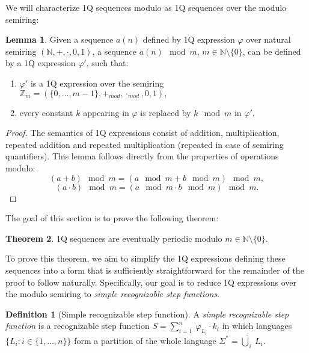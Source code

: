 \documentclass[12pt]{article}
\theoremstyle{definition}
\newtheorem{definition}{Definition}[section]
\newtheorem{theorem}{Theorem}[section]
\newtheorem{lemma}[theorem]{Lemma}
\begin{document}
We will characterize 1Q sequences modulo as 1Q sequences over the modulo semiring:

\begin{lemma}
    \label{1QModulo}
    Given a sequence $a(n)$ defined by 1Q expression $\varphi$ over natural semiring $(\mathbb{N}, +, \cdot, 0, 1)$, a sequence $a(n) \mod m$, $m \in \mathbb{N} \setminus \{0\}$, can be defined by a 1Q expression $\varphi'$, such that:
    \begin{enumerate}
        \item $\varphi'$ is a 1Q expression over the semiring $\mathbb{Z}_m = (\{0,\ldots,m-1\}, +_{mod}, \cdot_{mod}, 0, 1),$
        \item every constant $k$ appearing in $\varphi$ is replaced by $k \mod m$ in $\varphi'.$
    \end{enumerate}
\end{lemma}

\begin{proof}
    The semantics of 1Q expressions consist of addition, multiplication, repeated addition and repeated multiplication (repeated in case of semiring quantifiers). This lemma follows directly from the properties of operations modulo:
    $$(a + b) \mod m = (a \mod m + b \mod m) \mod m,$$
    $$(a \cdot b) \mod m = (a \mod m \cdot b \mod m) \mod m.$$
\end{proof}

The goal of this section is to prove the following theorem:

\begin{theorem}
    \label{1QSequencesPeriodic}
    1Q sequences are eventually periodic modulo $m \in \mathbb{N} \setminus \{0\}$.
\end{theorem}

To prove this theorem, we aim to simplify the 1Q expressions defining these sequences into a form that is sufficiently straightforward for the remainder of the proof to follow naturally. Specifically, our goal is to reduce 1Q expressions over the modulo semiring to \emph{simple recognizable step functions}.

\begin{definition}[Simple recognizable step function]
    \label{DefSimpleRecStepFun}
    A \textit{simple recognizable step function} is a recognizable step function $S = \sum_{i = 1}^{n} \ \varphi_{L_i} \cdot k_i$ in which languages $\{L_i : i \in \{1,\ldots,n\}\}$ form a partition of the whole language $\Sigma^* = \dot{\bigcup}_i \ L_i$.
\end{definition}
\end{document}

